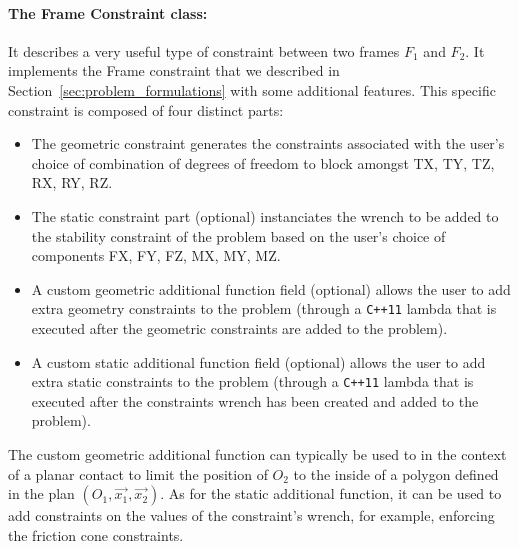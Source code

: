 \paragraph{The Frame Constraint class:}
It describes a very useful type of constraint between two frames $F_1$ and $F_2$.
It implements the Frame constraint that we described in Section~\ref{sec:problem_formulations} with some additional features.
This specific constraint is composed of four distinct parts:
\begin{itemize}
  \item The geometric constraint generates the constraints associated with the user's choice of combination of degrees of freedom to block amongst TX, TY, TZ, RX, RY, RZ.
  \item The static constraint part (optional) instanciates the wrench to be added to the stability constraint of the problem based on the user's choice of components FX, FY, FZ, MX, MY, MZ.
  \item A custom geometric additional function field (optional) allows the user to add extra geometry constraints to the problem (through a \texttt{C++11} lambda that is executed after the geometric constraints are added to the problem).
  \item A custom static additional function field (optional) allows the user to add extra static constraints to the problem (through a \texttt{C++11} lambda that is executed after the constraints wrench has been created and added to the problem).
\end{itemize}
The custom geometric additional function can typically be used to in the context of a planar contact to limit the position of $O_2$ to the inside of a polygon defined in the plan $(O_1,\vec{x_1},\vec{x_2})$.
As for the static additional function, it can be used to add constraints on the values of the constraint's wrench, for example, enforcing the friction cone constraints.


